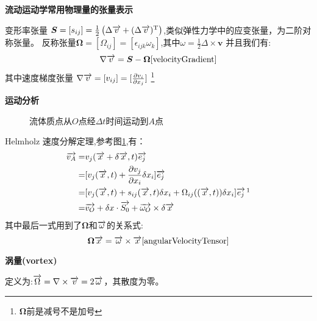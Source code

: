 \textbf{流动运动学常用物理量的张量表示}

变形率张量
$\bm{S}=[s_{ij}]=\frac{1}{2}\left(\Delta \overrightarrow{v}+(\Delta \overrightarrow{v})^{\mathrm{T}}\right)$,类似弹性力学中的应变张量，为二阶对称张量。
反称张量$\bm{\Omega}=[\Omega_{ij}]=[\epsilon_{ijk}\omega_k]$,其中$\omega=\frac{1}{2}\Delta \times \bm{v}$
并且我们有:
\begin{equation}\label{eq:w31AS}
\nabla \overrightarrow{v}=\bm{S}-\bm{\Omega}\cite{velocityGradient}
\end{equation}
其中速度梯度张量 $\nabla \overrightarrow{v}=[v_{ij}]=[\frac{\partial v_i}{\partial x_j}]$
\footnote{$\bm{\Omega}$前是减号不是加号}

\textbf{运动分析}

\begin{figure}[!ht]
\centering

\caption{流体质点从$O$点经$\Delta t$时间运动到$A$点}\label{fig:311}
\end{figure}

Helmholz 速度分解定理,参考图\ref{fig:311},有：
\begin{align}
\v{v_{A}} = & v_j(\v{x}+\delta \v{x},t)\v{e_j}\\
=& [v_j(\v{x},t)+\frac{\partial v_j}{\partial x_i}\delta x_i]\v{e_j}\\
=& [v_j(\v{x},t)+s_{ij}(\v{x},t)\delta x_i+\Omega_{ij}((\v{x},t))\delta x_i]\v{e_j}\,\footnotemark\\
=& \v{v_O} + \delta x \cdot \v{S_0} + \v{\omega_O}\times \delta \v{x}
\end{align}
其中最后一式用到了$\bm{\Omega}$和$\overrightarrow{\omega}$的关系式:
\begin{equation}
\bm{\Omega} \overrightarrow{x}= \overrightarrow{\omega}\times \overrightarrow{x} \cite{angularVelocityTensor}
\end{equation}


\textbf{涡量(vortex)}

定义为:$\overrightarrow{\Omega}=\nabla \times \overrightarrow{v}=2\overrightarrow{\omega}$，其散度为零。

